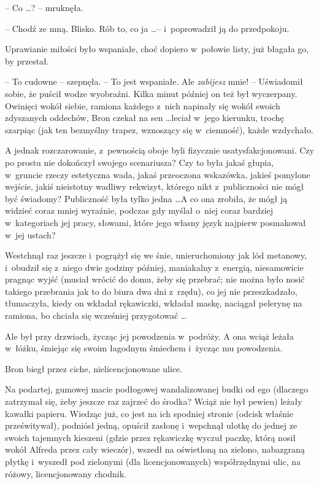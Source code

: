\documentclass[oneside,polish,11pt,rmheadings]{mwbk}
\begin{document}
-- Co \ldots ? -- mruknęła. 

-- Chodź ze mną. Blisko. Rób to, co ja \ldots  -- i~poprowadził ją do przedpokoju. 

Uprawianie miłości było wspaniałe, choć dopiero w~połowie listy, już błagała go, by przestał.  

-- To cudowne -- szepnęła. -- To jest wspaniałe. Ale \textit{zabijesz }mnie! -- Uświadomił sobie, że puścił wodze wyobraźni. Kilka minut później on też był wyczerpany. Owinięci wokół siebie, ramiona każdego z~nich napinały się wokół swoich zdyszanych oddechów, Bron czekał na sen \ldots  leciał w~jego kierunku, trochę szarpiąc (jak ten bezmyślny trapez, wznoszący się w~ciemność), każde wzdychało. 

A jednak rozczarowanie, z~pewnością oboje byli fizycznie usatysfakcjonowani. Czy po prostu nie dokończył swojego scenariusza? Czy to była jakaś głupia, w~gruncie rzeczy estetyczna wada, jakaś przeoczona wskazówka, jakieś pomylone wejście, jakiś nieistotny wadliwy rekwizyt, którego nikt z~publiczności nie mógł być świadomy? Publiczność była tylko jedna \ldots  A co ona zrobiła, że mógł ją widzieć coraz mniej wyraźnie, podczas gdy myślał o~niej coraz bardziej w~kategoriach jej pracy, słowami, które jego własny język najpierw posmakował w~jej ustach? 

Westchnął raz jeszcze i~pogrążył się we śnie, unieruchomiony jak lód metanowy, i~obudził się z~niego dwie godziny później, maniakalny z~energią, niesamowicie pragnąc wyjść (musiał wrócić do domu, żeby się przebrać; nie można było nosić takiego przebrania jak to do biura dwa dni z~rzędu), co jej nie przeszkadzało, tłumaczyła, kiedy on wkładał rękawiczki, wkładał maskę, naciągał pelerynę na ramiona, bo chciała się wcześniej przygotować \ldots  

Ale był przy drzwiach, życząc jej powodzenia w~podróży. A ona wciąż leżała w~łóżku, śmiejąc się swoim łagodnym śmiechem i~życząc mu powodzenia. 

Bron biegł przez ciche, nielicencjonowane ulice. 

Na podartej, gumowej macie podłogowej wandalizowanej budki od ego (dlaczego zatrzymał się, żeby jeszcze raz zajrzeć do środka? Wciąż nie był pewien) leżały kawałki papieru. Wiedząc już, co jest na ich spodniej stronie (odcisk właśnie prześwitywał), podniósł jedną, opuścił zasłonę i~wepchnął ulotkę do jednej ze swoich tajemnych kieszeni (gdzie przez rękawiczkę wyczuł paczkę, którą nosił wokół Alfreda przez cały wieczór), wszedł na oświetloną na zielono, nabazgraną płytkę i~wyszedł pod zielonymi (dla licencjonowanych) współrzędnymi ulic, na różowy, licencjonowany chodnik. 
\end{document}
